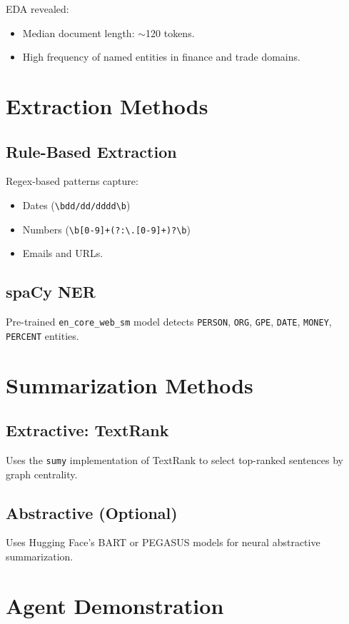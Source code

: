 \documentclass[12pt,a4paper]{article}
\begin{document}
EDA revealed:
\begin{itemize}[noitemsep]
  \item Median document length: $\sim$120 tokens.
  \item High frequency of named entities in finance and trade domains.
\end{itemize}

\section{Extraction Methods}
\subsection{Rule-Based Extraction}
Regex-based patterns capture:
\begin{itemize}[noitemsep]
  \item Dates (\texttt{\textbackslash bdd/dd/dddd\textbackslash b})
  \item Numbers (\texttt{\textbackslash b[0-9]+(?:\textbackslash .[0-9]+)?\textbackslash b})
  \item Emails and URLs.
\end{itemize}

\subsection{spaCy NER}
Pre-trained \texttt{en\_core\_web\_sm} model detects \texttt{PERSON}, \texttt{ORG}, \texttt{GPE}, \texttt{DATE}, \texttt{MONEY}, \texttt{PERCENT} entities.

\section{Summarization Methods}
\subsection{Extractive: TextRank}
Uses the \texttt{sumy} implementation of TextRank to select top-ranked sentences by graph centrality.

\subsection{Abstractive (Optional)}
Uses Hugging Face's BART or PEGASUS models for neural abstractive summarization.

\section{Agent Demonstration}
\end{document}
